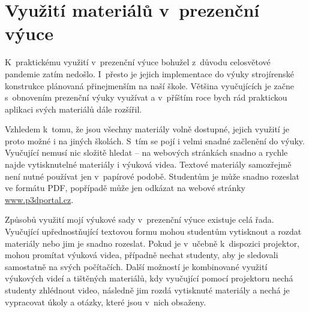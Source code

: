 \section{Využití materiálů v~prezenční výuce}
K~praktickému využití v~prezenční výuce bohužel z~důvodu celosvětové pandemie zatím nedošlo. 
I~přesto je jejich implementace do výuky strojírenské konstrukce plánovaná přinejmenším na naší škole.
Většina vyučujících je začne s~obnovením prezenční výuky využívat a v~příštím roce bych rád praktickou aplikaci svých materiálů dále rozšířil.

Vzhledem k~tomu, že jsou všechny materiály volně dostupné, jejich využití je proto možné i na jiných školách.
S~tím se pojí i velmi snadné začlenění do výuky.
Vyučující nemusí nic složitě hledat -- na webových stránkách snadno a rychle najde vytisknutelné materiály i výuková videa.
Textové materiály samozřejmě není nutné používat jen v~papírové podobě. Studentům je může snadno rozeslat ve formátu PDF, popřípadě může jen odkázat na webové stránky \href{https://www.p3dportal.cz}{www.p3dportal.cz}.

Způsobů využití mojí výukové sady v~prezenční výuce existuje celá řada.
Vyučující upřednostňující textovou formu mohou studentům vytisknout a rozdat materiály nebo jim je snadno rozeslat.
Pokud je v~učebně k~dispozici projektor, mohou promítat výuková videa, případně nechat studenty, aby je sledovali samostatně na svých počítačích.
Další možností je kombinované využití výukových videí a tištěných materiálů, kdy vyučující pomocí projektoru nechá studenty zhlédnout video, následně jim rozdá vytisknuté materiály a nechá je vypracovat úkoly a otázky, které jsou v~nich obsaženy.
